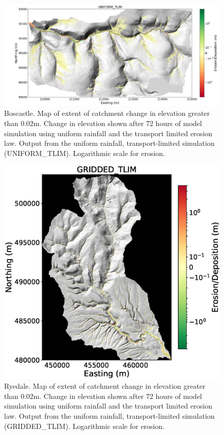 \begin{figure}
\includegraphics[width=25cm]{chp06_figures_scripts/boscastle_erodediff_uniform_tlim.png}
\caption{Boscastle. Map of extent of catchment change in elevation greater than 0.02m. Change in elevation shown after 72 hours of model simulation using uniform rainfall and the transport limited erosion law. Output from the uniform rainfall, transport-limited simulation (UNIFORM\_TLIM). Logarithmic scale for erosion.}
\label{fig_boscastle_erodediff_uniform_tlim}
\end{figure}

\begin{figure}[t]
\includegraphics[width=16cm]{chp06_figures_scripts/figure_ryedale_elev_diff_grid_tlim.eps}
\caption{Ryedale. Map of extent of catchment change in elevation greater than 0.02m. Change in elevation shown after 72 hours of model simulation using uniform rainfall and the transport limited erosion law. Output from the uniform rainfall, transport-limited simulation (GRIDDED\_TLIM). Logarithmic scale for erosion.}
\label{fig_ryedale_erodediff_gridded_tlim}
\end{figure}

